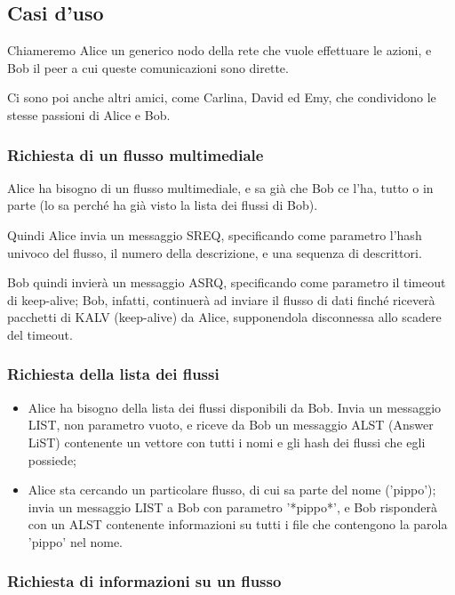 \subsection{Casi d'uso}

Chiameremo Alice un generico nodo della rete che vuole effettuare le azioni, e
Bob il peer a cui queste comunicazioni sono dirette.

Ci sono poi anche altri amici, come Carlina, David ed Emy, che condividono le
stesse passioni di Alice e Bob.


\subsubsection{Richiesta di un flusso multimediale}
%

Alice ha bisogno di un flusso multimediale, e sa già che Bob ce l'ha, tutto o in
parte (lo sa perché ha già visto la lista dei flussi di Bob).

Quindi Alice invia un messaggio SREQ, specificando come parametro l'hash univoco
del flusso, il numero della descrizione, e una sequenza di descrittori.

Bob quindi invierà un messaggio ASRQ, specificando come parametro il timeout di
keep-alive; Bob, infatti, continuerà ad inviare il flusso di dati finché riceverà
pacchetti di KALV (keep-alive) da Alice, supponendola disconnessa allo scadere
del timeout.






\subsubsection{Richiesta della lista dei flussi}
%

\begin{itemize}
\item Alice ha bisogno della lista dei flussi disponibili da Bob. Invia un messaggio LIST, non parametro vuoto, e riceve da Bob un messaggio ALST (Answer LiST) contenente un vettore con tutti i nomi e gli hash dei flussi che egli possiede;
\item Alice sta cercando un particolare flusso, di cui sa parte del nome
('pippo'); invia un messaggio LIST a Bob con parametro '*pippo*', e Bob
risponderà con un ALST contenente informazioni su tutti i file che contengono la
parola 'pippo' nel nome.
\end{itemize}




\subsubsection{Richiesta di informazioni su un flusso}
%


